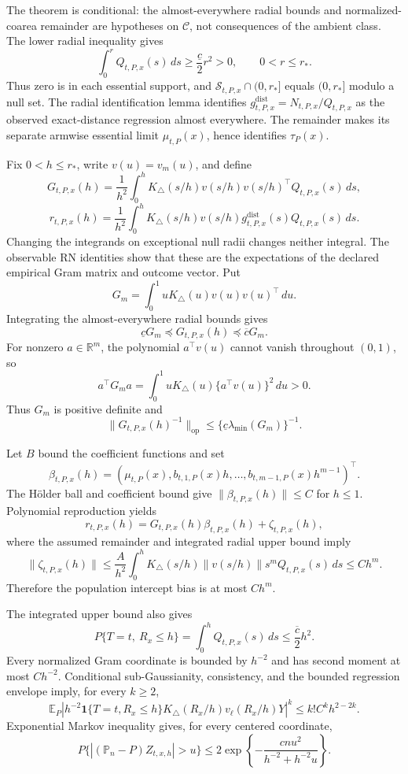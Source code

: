 The theorem is conditional: the almost-everywhere radial bounds and normalized-coarea remainder are hypotheses on \(\mathcal C\), not consequences of the ambient class.  The lower radial inequality gives
\[
 \int_0^rQ_{t,P,x}(s)\,ds\geq\frac{\underline c}{2}r^2>0,
 \qquad 0<r\leq r_*.
\]
Thus zero is in each essential support, and \(\mathcal S_{t,P,x}\cap(0,r_*]\) equals \((0,r_*]\) modulo a null set.  The radial identification lemma identifies \(g^{\mathrm{dist}}_{t,P,x}=N_{t,P,x}/Q_{t,P,x}\) as the observed exact-distance regression almost everywhere.  The remainder makes its separate armwise essential limit \(\mu_{t,P}(x)\), hence identifies \(\tau_P(x)\).

Fix \(0<h\leq r_*\), write \(v(u)=v_m(u)\), and define
\[
 G_{t,P,x}(h)=\frac1{h^2}\int_0^hK_\triangle(s/h)
 v(s/h)v(s/h)^\top Q_{t,P,x}(s)\,ds,
\]
\[
 r_{t,P,x}(h)=\frac1{h^2}\int_0^hK_\triangle(s/h)
 v(s/h)g^{\mathrm{dist}}_{t,P,x}(s)Q_{t,P,x}(s)\,ds.
\]
Changing the integrands on exceptional null radii changes neither integral.  The observable RN identities show that these are the expectations of the declared empirical Gram matrix and outcome vector.  Put
\[
 G_m=\int_0^1uK_\triangle(u)v(u)v(u)^\top\,du.
\]
Integrating the almost-everywhere radial bounds gives
\[
 \underline cG_m\preceq G_{t,P,x}(h)\preceq\overline cG_m.
\]
For nonzero \(a\in\mathbb R^m\), the polynomial \(a^\top v(u)\) cannot vanish throughout \((0,1)\), so
\[
 a^\top G_ma=\int_0^1uK_\triangle(u)\{a^\top v(u)\}^2\,du>0.
\]
Thus \(G_m\) is positive definite and
\[
 \lVert G_{t,P,x}(h)^{-1}\rVert_{\mathrm{op}}
 \leq\{\underline c\lambda_{\min}(G_m)\}^{-1}.
\]

Let \(B\) bound the coefficient functions and set
\[
 \beta_{t,P,x}(h)=
 (\mu_{t,P}(x),b_{t,1,P}(x)h,\ldots,
 b_{t,m-1,P}(x)h^{m-1})^\top.
\]
The H\"older ball and coefficient bound give \(\lVert\beta_{t,P,x}(h)\rVert\leq C\) for \(h\leq1\).  Polynomial reproduction yields
\[
 r_{t,P,x}(h)=G_{t,P,x}(h)\beta_{t,P,x}(h)+\zeta_{t,P,x}(h),
\]
where the assumed remainder and integrated radial upper bound imply
\[
 \lVert\zeta_{t,P,x}(h)\rVert
 \leq\frac A{h^2}\int_0^hK_\triangle(s/h)
 \lVert v(s/h)\rVert s^mQ_{t,P,x}(s)\,ds
 \leq Ch^m.
\]
Therefore the population intercept bias is at most \(Ch^m\).

The integrated upper bound also gives
\[
 P\{T=t,\ R_x\leq h\}=\int_0^hQ_{t,P,x}(s)\,ds
 \leq\frac{\overline c}{2}h^2.
\]
Every normalized Gram coordinate is bounded by \(h^{-2}\) and has second moment at most \(Ch^{-2}\).  Conditional sub-Gaussianity, consistency, and the bounded regression envelope imply, for every \(k\geq2\),
\[
 \mathbb E_P\left|h^{-2}\mathbf1\{T=t,R_x\leq h\}
 K_\triangle(R_x/h)v_\ell(R_x/h)Y\right|^k
 \leq k!C^kh^{2-2k}.
\]
Exponential Markov inequality gives, for every centered coordinate,
\[
 P\{|(\mathbb P_n-P)Z_{t,x,h}|>u\}
 \leq2\exp\!\left\{-\frac{cnu^2}{h^{-2}+h^{-2}u}\right\}.
\]

